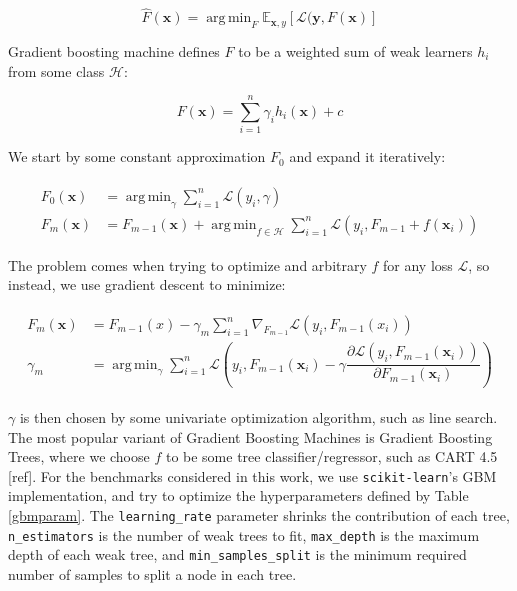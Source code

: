 \documentclass[10pt,a4paper,twoside]{book}
\DeclareMathOperator*{\argmin}{arg\,min}
\begin{document}
\begin{equation}
\hat{F}(\boldsymbol{x}) = \argmin_{F}\mathbb{E}_{\boldsymbol{x}, y}\left[ \mathcal{L}(\boldsymbol{y}, F(\boldsymbol{x})\right]
\end{equation} 

Gradient boosting machine defines $F$ to be a weighted sum of weak learners $h_i$ from some class $\mathcal{H}$:

\begin{equation}
F(\boldsymbol{x}) = \sum_{i=1}^n \gamma_i h_i(\boldsymbol{x}) + c
\end{equation}

We start by some constant approximation $F_0$ and expand it iteratively:

\begin{align}
\begin{split}
F_0(\boldsymbol{x}) &= \argmin_{\gamma} \sum_{i=1}^n \mathcal{L}(y_i, \gamma)\\
F_m(\boldsymbol{x}) &= F_{m-1}(\boldsymbol{x}) + \argmin_{f \in \mathcal{H}} \sum_{i=1}^n \mathcal{L}(y_i, F_{m-1} + f(\boldsymbol{x}_i))
\end{split}
\end{align}

The problem comes when trying to optimize and arbitrary $f$ for any loss $\mathcal{L}$, so instead, we use gradient descent to minimize:

\begin{align}
\begin{split}
F_m(\boldsymbol{x}) &= F_{m-1}(x) - \gamma_m \sum_{i=1}^n \nabla_{F_{m-1}} \mathcal{L}(y_i, F_{m-1}(x_i))\\
\gamma_m &= \argmin_{\gamma} \sum_{i=1}^n \mathcal{L}\left( y_i, F_{m-1}(\boldsymbol{x}_i) - \gamma \dfrac{\partial \mathcal{L}\left(y_i, F_{m-1}(\boldsymbol{x}_i)\right)}{\partial F_{m-1}(\boldsymbol{x}_i)} \right)
\end{split}
\end{align}

$\gamma$ is then chosen by some univariate optimization algorithm, such as line search. The most popular variant of Gradient Boosting Machines is Gradient Boosting Trees, where we choose $f$ to be some tree classifier/regressor, such as CART 4.5 [ref]. For the benchmarks considered in this work, we use \texttt{scikit-learn}'s GBM implementation, and try to optimize the hyperparameters defined by Table \ref{gbmparam}. The \texttt{learning\_rate} parameter shrinks the contribution of each tree, \texttt{n\_estimators} is the number of weak trees to fit, \texttt{max\_depth} is the maximum depth of each weak tree, and \texttt{min\_samples\_split} is the minimum required number of samples to split a node in each tree.
\end{document}
